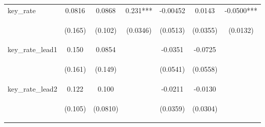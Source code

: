 \begin{tabular}{lcccccc}
key\_rate & 0.0816 & 0.0868 & 0.231*** & -0.00452 & 0.0143 & -0.0500*** \\
\vspace{4pt} & \begin{footnotesize}(0.165)\end{footnotesize} & \begin{footnotesize}(0.102)\end{footnotesize} & \begin{footnotesize}(0.0346)\end{footnotesize} & \begin{footnotesize}(0.0513)\end{footnotesize} & \begin{footnotesize}(0.0355)\end{footnotesize} & \begin{footnotesize}(0.0132)\end{footnotesize} \\
key\_rate\_lead1 & 0.150 & 0.0854 &  & -0.0351 & -0.0725 &  \\
\vspace{4pt} & \begin{footnotesize}(0.161)\end{footnotesize} & \begin{footnotesize}(0.149)\end{footnotesize} & \begin{footnotesize}\end{footnotesize} & \begin{footnotesize}(0.0541)\end{footnotesize} & \begin{footnotesize}(0.0558)\end{footnotesize} & \begin{footnotesize}\end{footnotesize} \\
key\_rate\_lead2 & 0.122 & 0.100 &  & -0.0211 & -0.0130 &  \\
\vspace{4pt} & \begin{footnotesize}(0.105)\end{footnotesize} & \begin{footnotesize}(0.0810)\end{footnotesize} & \begin{footnotesize}\end{footnotesize} & \begin{footnotesize}(0.0359)\end{footnotesize} & \begin{footnotesize}(0.0304)\end{footnotesize} & \begin{footnotesize}\end{footnotesize} \\

\end{tabular}
